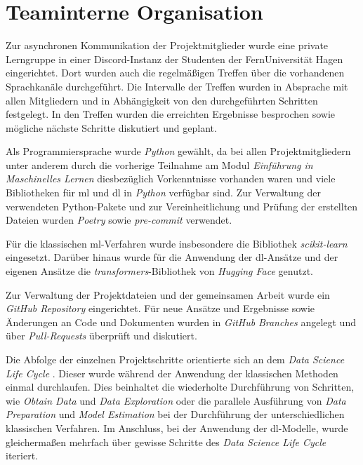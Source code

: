 \section{Teaminterne Organisation}\label{sec:teaminterneorganisation}

Zur asynchronen Kommunikation der Projektmitglieder wurde eine private Lerngruppe in einer Discord-Instanz der Studenten der FernUniversität Hagen eingerichtet.
Dort wurden auch die regelmäßigen Treffen über die vorhandenen Sprachkanäle durchgeführt.
Die Intervalle der Treffen wurden in Absprache mit allen Mitgliedern und in Abhängigkeit von den durchgeführten Schritten festgelegt.
In den Treffen wurden die erreichten Ergebnisse besprochen sowie mögliche nächste Schritte diskutiert und geplant.

Als Programmiersprache wurde \textit{Python} gewählt, da bei allen Projektmitgliedern unter anderem durch die vorherige Teilnahme am Modul \textit{Einführung in Maschinelles Lernen} diesbezüglich Vorkenntnisse vorhanden waren und viele Bibliotheken für \gls{ml} und \gls{dl} in \textit{Python} verfügbar sind.
Zur Verwaltung der verwendeten Python-Pakete und zur Vereinheitlichung und Prüfung der erstellten Dateien wurden \textit{Poetry} \cite{poetry2025} sowie \textit{pre-commit} \cite{precommit2025} verwendet.

Für die klassischen \gls{ml}-Verfahren wurde insbesondere die Bibliothek \textit{scikit-learn} eingesetzt.
Darüber hinaus wurde für die Anwendung der \gls{dl}-Ansätze und der eigenen Ansätze die \textit{transformers}-Bibliothek von \textit{Hugging Face} genutzt.

Zur Verwaltung der Projektdateien und der gemeinsamen Arbeit wurde ein \textit{GitHub Repository} \cite{githubrepo2025} eingerichtet.
Für neue Ansätze und Ergebnisse sowie Änderungen an Code und Dokumenten wurden in \textit{GitHub} \textit{Branches} angelegt und über \textit{Pull-Requests} überprüft und diskutiert.

Die Abfolge der einzelnen Projektschritte orientierte sich an dem \textit{Data Science Life Cycle} \cite[Abb. 2]{Stodden2020}.
Dieser wurde während der Anwendung der klassischen Methoden einmal durchlaufen.
Dies beinhaltet die wiederholte Durchführung von Schritten, wie \textit{Obtain Data} und \textit{Data Exploration} oder die parallele Ausführung von \textit{Data Preparation} und \textit{Model Estimation} bei der Durchführung der unterschiedlichen klassischen Verfahren.
Im Anschluss, bei der Anwendung der \gls{dl}-Modelle, wurde gleichermaßen mehrfach über gewisse Schritte des \textit{Data Science Life Cycle} iteriert.
